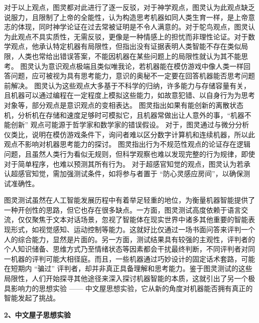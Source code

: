 对于以上观点，图灵都对此进行了逐一反驳，对于神学观点，图灵认为此观点缺乏说服力，且限制了上帝的全能性，认为构造思考机器如同人类生育一样，是上帝意志的体现，同时神学论证在过去常被证明是不令人满意的。对于鸵鸟观点，图灵认为此观点不具实质性，无需反驳，更像是一种情感上的担忧而非理性论证。对于数学观点，他承认特定机器有局限性，但指出没有证据表明人类智能不存在类似局限，人类也常给出错误答案，不能因机器在某些问题上的局限性就认为其不能思考。
图灵认为意识观点极端且类似唯我论，若机器能在模仿游戏中像人类一样回答问题，应可被视为具有思考能力，意识的奥秘不一定要在回答机器能否思考问题前解决。
图灵认为这些观点大多基于不科学的归纳，许多能力与存储容量有关，且机器可以通过编程在一定程度上模拟这些能力，如故意犯错、以自身行为为思考对象等，部分观点是意识观点的变相表达。
图灵指出如果有能创新的离散状态机，分析机在存储和速度足够时可模拟它，且机器常做出让人意外的事，“机器不能创新” 观点可能源于哲学家和数学家的错误假设。
对于，图灵通过与微分分析仪类比，说明在模仿游戏条件下，询问者难以区分数字计算机和连续机器，所以此观点不影响对机器思考能力的探讨。
图灵指出行为不规范性观点的论证存在逻辑问题，且虽然人类行为看似无规则，但科学观察也难以发现完整的行为规律，即使对于简单程序，也难以预测其所有行为。
对于超感官知觉的观点，图灵认为若承认超感官知觉，需加强测试条件，如将参与者置于 “防心灵感应房间”，以确保测试准确性。


图灵测试虽然在人工智能发展历程中有着举足轻重的地位，为衡量机器智能提供了一种开创性的思路，但它也存在很多缺点。一方面，图灵测试高度依赖于语言交流，仅仅聚焦于文本对话场景，忽视了智能体在现实世界中诸多其他重要的智能表现形式，如视觉感知、运动控制等能力。这就好比仅通过一场书面问答来评判一个人的综合能力，显然是片面的。另一方面，测试结果具有较强的主观性，评判者的个人知识储备、思维方式乃至情绪状态等因素都会干扰最终判断，不同评判者对同一机器的评判可能大相径庭。而且，一些机器通过巧妙设计的固定话术套路，可能在短期内 “骗过” 评判者，却并非真正具备理解和思考能力。鉴于图灵测试的这些局限性，人们开始探寻其他途径来深入探讨机器智能的本质，这就引出了另一个极具影响力的思想实验 —— 中文屋思想实验，它从新的角度对机器能否拥有真正的智能发起了挑战。


\textbf{2、中文屋子思想实验}


